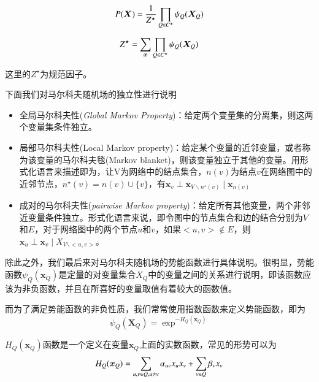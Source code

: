 \begin{equation}
	P(\bm{X}) = \frac{1}{Z^{\star}} \prod_{Q \in C^{\star}} \psi_Q(\bm{X}_Q) \\
\end{equation}


\begin{equation}
Z^{\star} = \sum_{\bm{x}} \prod_{Q \in C^{\star}} \psi_Q(\bm{X}_Q) \\
\end{equation}


这里的$Z^{\star}$为规范因子。


下面我们对马尔科夫随机场的独立性进行说明 \\
\begin{itemize}
\item 全局马尔科夫性(\textit{Global Markov Property})：给定两个变量集的分离集，则这两个变量集条件独立。 \\
\item 局部马尔科夫性(Local Markov property)：给定某个变量的近邻变量，或者称为该变量的马尔科夫毯(Markov blanket)，则该变量独立于其他的变量。用形式化语言来描述即为，让V为网络中的结点集合，$n(v)$为结点$v$在网络图中的近邻节点，$n^{\star}(v) = n(v)\cup \{v\}$，有$\bm{x}_v \perp \bm{x}_{V 	\backslash n^{\star}(v)} \mid \bm{x}_{n(v)} $ \\

\item 成对的马尔科夫性(\textit{pairwise Markov property})：给定所有其他变量，两个非邻近变量条件独立。形式化语言来说，即令图中的节点集合和边的结合分别为$V$和$E$，对于网络图中的两个节点$u$和$v$，如果$<u,v> \notin E$，则$\bm{x}_u \perp \bm{x}_v \mid X_{V \backslash <u, v>}$。\\


\end{itemize}



除此之外，我们最后来对马尔科夫随机场的势能函数进行具体说明。很明显，势能函数$\psi_Q(\bm{x}_Q)$是定量的对变量集合$X_Q$中的变量之间的关系进行说明，即该函数应该为非负函数，并且在所喜好的变量取值有着较大的函数值。

而为了满足势能函数的非负性质，我们常常使用指数函数来定义势能函数，即为
\begin{equation}
\psi_Q(\bm{X}_Q) = \exp^{-H_Q(\bm{x}_Q)}
\end{equation}

$H_Q(\bm{x}_Q)$函数是一个定义在变量$\bm{x}_Q$上面的实数函数，常见的形势可以为
\begin{equation}
H_Q(\bm{x}_Q) = \sum_{u,v \in Q, u \neq v} \alpha_{uv} x_u x_v + \sum_{v \in Q} \beta_v x_v \\
\end{equation}

